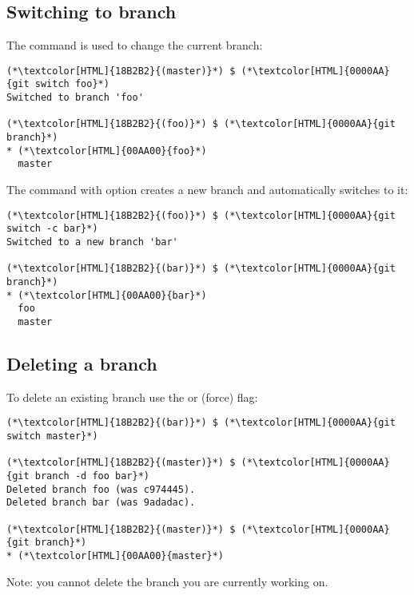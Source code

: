 \subsection{Switching to branch}
\begin{frame}[fragile]
  \subslidetitle
  The  command is used to change the current branch:
  \begin{lstlisting}
(*\textcolor[HTML]{18B2B2}{(master)}*) $ (*\textcolor[HTML]{0000AA}{git switch foo}*)
Switched to branch 'foo'

(*\textcolor[HTML]{18B2B2}{(foo)}*) $ (*\textcolor[HTML]{0000AA}{git branch}*)
* (*\textcolor[HTML]{00AA00}{foo}*)
  master
\end{lstlisting}

  \vspace{1em}
  The  command with  option creates a new branch and automatically switches to it:
  \begin{lstlisting}
(*\textcolor[HTML]{18B2B2}{(foo)}*) $ (*\textcolor[HTML]{0000AA}{git switch -c bar}*)
Switched to a new branch 'bar'

(*\textcolor[HTML]{18B2B2}{(bar)}*) $ (*\textcolor[HTML]{0000AA}{git branch}*)
* (*\textcolor[HTML]{00AA00}{bar}*)
  foo
  master
\end{lstlisting}
\end{frame}

\subsection{Deleting a branch}
\begin{frame}[fragile]
  \subslidetitle
  To delete an existing branch use the  or  (force) flag:
\begin{lstlisting}
(*\textcolor[HTML]{18B2B2}{(bar)}*) $ (*\textcolor[HTML]{0000AA}{git switch master}*)

(*\textcolor[HTML]{18B2B2}{(master)}*) $ (*\textcolor[HTML]{0000AA}{git branch -d foo bar}*)
Deleted branch foo (was c974445).
Deleted branch bar (was 9adadac).

(*\textcolor[HTML]{18B2B2}{(master)}*) $ (*\textcolor[HTML]{0000AA}{git branch}*)
* (*\textcolor[HTML]{00AA00}{master}*)
\end{lstlisting}

  \vspace{1em}
  Note: you cannot delete the branch you are currently working on.
\end{frame}

